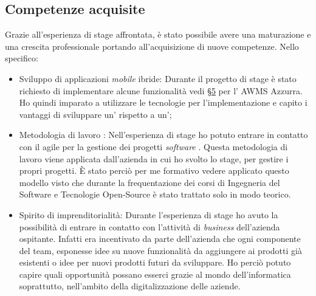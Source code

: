 \subsection{Competenze acquisite}
Grazie all'esperienza di stage affrontata, è stato possibile avere una maturazione e una crescita professionale portando all’acquisizione di nuove competenze. Nello specifico:
\begin{itemize}
	\item Sviluppo di applicazioni \emph{mobile} ibride: Durante il progetto di stage è stato richiesto di implementare alcune funzionalità vedi \hyperref[cap:flussi di conversazione]{§5} per l' \gls{AWMS} Azzurra. Ho quindi imparato a utilizzare le tecnologie per l'implementazione e capito i vantaggi di sviluppare un' rispetto a un';
	\item Metodologia di lavoro : Nell'esperienza di stage ho potuto entrare in contatto con il  agile per la gestione dei progetti \emph{software} . Questa metodologia di lavoro viene applicata dall'azienda in cui ho svolto lo stage, per gestire i propri progetti. È stato perciò per me formativo vedere applicato questo modello visto che durante la frequentazione dei corsi di Ingegneria del Software e Tecnologie Open-Source è stato trattato solo in modo teorico.
	\item Spirito di imprenditorialità: Durante l'esperienza di stage ho avuto la possibilità di entrare in contatto con l'attività di \emph{business} dell'azienda ospitante. Infatti era incentivato da parte dell'azienda che ogni componente del team, esponesse idee su nuove funzionalità da aggiungere ai prodotti già esistenti o idee per nuovi prodotti futuri da sviluppare.
	 Ho perciò potuto capire quali opportunità possano esserci grazie al mondo dell'informatica soprattutto, nell'ambito della digitalizzazione delle aziende.
\end{itemize}
